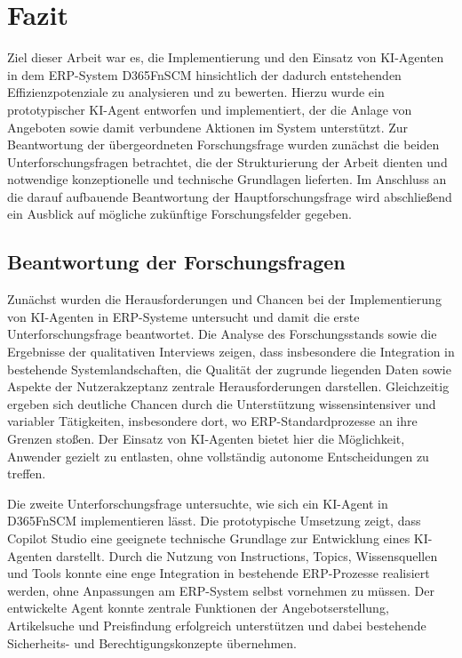 \section{Fazit}
Ziel dieser Arbeit war es, die Implementierung und den Einsatz von \ac{KI}-Agenten in dem \ac{ERP}-System \ac{D365FnSCM} hinsichtlich der dadurch entstehenden Effizienzpotenziale zu analysieren und zu bewerten. Hierzu wurde ein prototypischer \ac{KI}-Agent entworfen und implementiert, der die Anlage von Angeboten sowie damit verbundene Aktionen im System unterstützt.
Zur Beantwortung der übergeordneten Forschungsfrage wurden zunächst die beiden Unterforschungsfragen betrachtet, die der Strukturierung der Arbeit dienten und notwendige konzeptionelle und technische Grundlagen lieferten.
Im Anschluss an die darauf aufbauende Beantwortung der Hauptforschungsfrage wird abschließend ein Ausblick auf mögliche zukünftige Forschungsfelder gegeben.

\subsection{Beantwortung der Forschungsfragen}
Zunächst wurden die Herausforderungen und Chancen bei der Implementierung von \ac{KI}-Agenten in \ac{ERP}-Systeme untersucht und damit die erste Unterforschungsfrage beantwortet. Die Analyse des Forschungsstands sowie die Ergebnisse der qualitativen Interviews zeigen, dass insbesondere die Integration in bestehende Systemlandschaften, die Qualität der zugrunde liegenden Daten sowie Aspekte der Nutzerakzeptanz zentrale Herausforderungen darstellen. Gleichzeitig ergeben sich deutliche Chancen durch die Unterstützung wissensintensiver und variabler Tätigkeiten, insbesondere dort, wo \ac{ERP}-Standardprozesse an ihre Grenzen stoßen. Der Einsatz von \ac{KI}-Agenten bietet hier die Möglichkeit, Anwender gezielt zu entlasten, ohne vollständig autonome Entscheidungen zu treffen.

Die zweite Unterforschungsfrage untersuchte, wie sich ein \ac{KI}-Agent in \ac{D365FnSCM} implementieren lässt. Die prototypische Umsetzung zeigt, dass Copilot Studio eine geeignete technische Grundlage zur Entwicklung eines \ac{KI}-Agenten darstellt. Durch die Nutzung von Instructions, Topics, Wissensquellen und Tools konnte eine enge Integration in bestehende \ac{ERP}-Prozesse realisiert werden, ohne Anpassungen am \ac{ERP}-System selbst vornehmen zu müssen. Der entwickelte Agent konnte zentrale Funktionen der Angebotserstellung, Artikelsuche und Preisfindung erfolgreich unterstützen und dabei bestehende Sicherheits- und Berechtigungskonzepte übernehmen.

